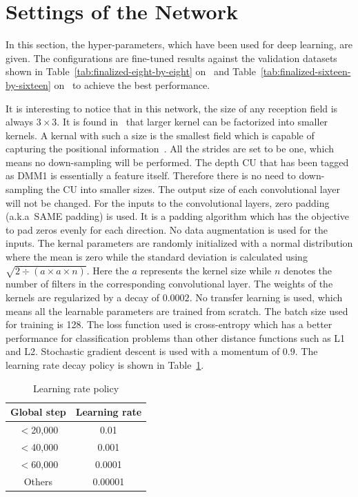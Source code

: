 \section{Settings of the Network}\label{sec:config}
In this section, the hyper-parameters, which have been
used for deep learning, are given.
The configurations are fine-tuned results against the validation
datasets shown in Table~\ref{tab:finalized-eight-by-eight}
on~\pageref{tab:finalized-eight-by-eight}
and Table~\ref{tab:finalized-sixteen-by-sixteen} 
on~\pageref{tab:finalized-sixteen-by-sixteen} to achieve the
best performance.

It is interesting to notice that in this network, 
the size of any reception field
is always \(3\times3\).
It is found in~\parencite{RN62} that
larger kernel can be factorized into smaller kernels.
A kernal with such a size is the smallest
field which is capable of capturing the positional
information~\parencite{RN107}.
All the strides are set to be one, which means
no down-sampling will be performed.
The depth CU that has been tagged as DMM1 is essentially
a feature itself.
Therefore there is no need to down-sampling
the CU into smaller sizes.
The output size of each convolutional layer
will not be changed.
For the inputs to the convolutional layers, 
zero padding (a.k.a\ SAME padding) is used.
It is a padding algorithm which has the objective
to pad zeros evenly for each direction.
No data augmentation is used for the inputs.
The kernal parameters are randomly initialized 
with a normal distribution where the mean 
is zero while the standard deviation is 
calculated using 
\(\sqrt{2\div(\mathit{a}\times\mathit{a}\times\mathit{n})}\).
Here the \(\mathit{a}\) represents the kernel size
while \(\mathit{n}\) denotes the number of filters
in the corresponding convolutional layer.
The weights of the kernels are regularized by
a decay of \(0.0002\).
No transfer learning is used, which means all the learnable 
parameters are trained from scratch.
The batch size used for training is 128.
The loss function used is cross-entropy which has
a better performance for classification problems 
than other distance functions such as L1 and L2.
Stochastic gradient descent is used with a momentum 
of \(0.9\).
The learning rate decay policy is shown in 
Table~\ref{tab:lr-policy}.

\begin{table}[H]
    \caption{Learning rate policy}
    \bigskip\label{tab:lr-policy}
    \centering
    \begin{tabular}{c c}
        \toprule
        Global step & Learning rate \\
        \midrule
        \(<\)20,000 & 0.01 \\
        \(<\)40,000 & 0.001 \\
        \(<\)60,000 & 0.0001 \\
        Others  & 0.00001 \\
        \bottomrule
    \end{tabular}
\end{table}

